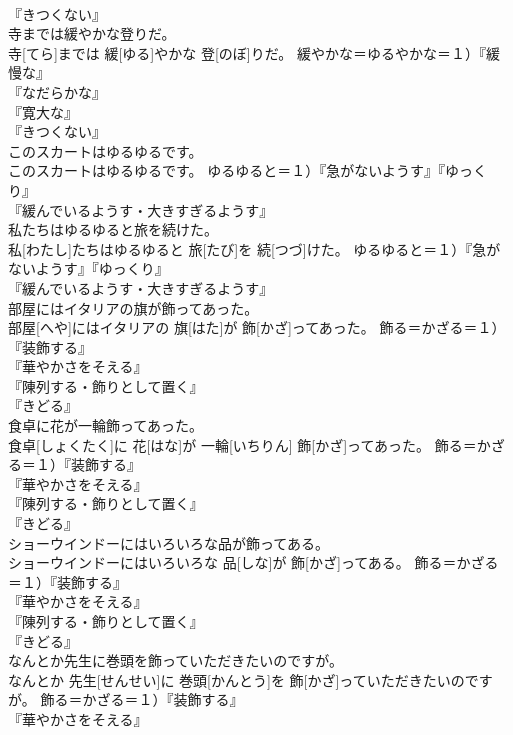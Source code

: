 \documentclass[8pt]{extreport}
\begin{document}
\begin{CJK}{UTF8}{min}
{\\	『きつくない』
\\	寺までは緩やかな登りだ。	
\\	寺[てら]までは 緩[ゆる]やかな 登[のぼ]りだ。	緩やかな＝ゆるやかな＝１）『緩慢な』
\\	『なだらかな』
\\	『寛大な』
\\	『きつくない』
\\	このスカートはゆるゆるです。	
\\	このスカートはゆるゆるです。	ゆるゆると＝１）『急がないようす』『ゆっくり』 　　　　　　
\\	『緩んでいるようす・大きすぎるようす』
\\	私たちはゆるゆると旅を続けた。	
\\	私[わたし]たちはゆるゆると 旅[たび]を 続[つづ]けた。	ゆるゆると＝１）『急がないようす』『ゆっくり』 　　　　　　
\\	『緩んでいるようす・大きすぎるようす』
\\	部屋にはイタリアの旗が飾ってあった。	
\\	部屋[へや]にはイタリアの 旗[はた]が 飾[かざ]ってあった。	飾る＝かざる＝１）『装飾する』
\\	『華やかさをそえる』 　　　　　　　
\\	『陳列する・飾りとして置く』
\\	『きどる』
\\	食卓に花が一輪飾ってあった。	
\\	食卓[しょくたく]に 花[はな]が 一輪[いちりん] 飾[かざ]ってあった。	飾る＝かざる＝１）『装飾する』
\\	『華やかさをそえる』 　　　　　　　
\\	『陳列する・飾りとして置く』
\\	『きどる』
\\	ショーウインドーにはいろいろな品が飾ってある。	
\\	ショーウインドーにはいろいろな 品[しな]が 飾[かざ]ってある。	飾る＝かざる＝１）『装飾する』
\\	『華やかさをそえる』 　　　　　　　
\\	『陳列する・飾りとして置く』
\\	『きどる』
\\	なんとか先生に巻頭を飾っていただきたいのですが。	
\\	なんとか 先生[せんせい]に 巻頭[かんとう]を 飾[かざ]っていただきたいのですが。	飾る＝かざる＝１）『装飾する』
\\	『華やかさをそえる』 　　　　　　　
}
\end{CJK}
\end{document}
